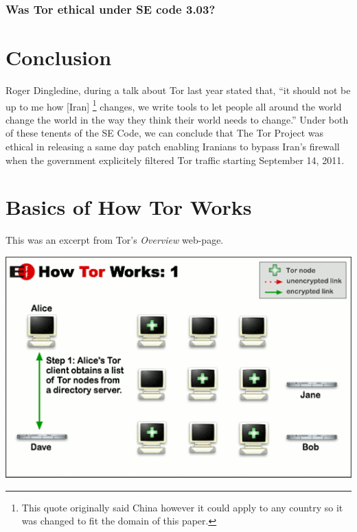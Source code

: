 \documentclass[11pt]{article}
\begin{document}
\begin{multicols}{2}
\subsubsection{Was Tor ethical under SE code 3.03?}

\section{Conclusion} 


Roger Dingledine, during a talk about Tor last year stated that, ``it should not
be up to me how [Iran] \footnote{This quote originally said China however it could
  apply to any country so it was changed to fit the domain of this
paper.} changes, we write tools to let people all around the world change the
world in the way they think their world needs to change.'' \cite{Tor:28c3} Under
both of these tenents of the SE Code, we can conclude that The Tor Project was
ethical in releasing a same day patch enabling Iranians to bypass Iran's
firewall when the government explicitely filtered Tor traffic starting September
14, 2011.


\end{multicols} \newpage

\appendix


\section{Basics of How Tor Works}
\label{Tor:HowTorWorks}

This was an excerpt from Tor's \textit{Overview} web-page.\cite{Tor:Overview}

\begin{center}
\includegraphics[natwidth=510bp,natheight=326bp,width= 0.7\linewidth]{appendix/htw1.png}
\end{center}

\end{document}
